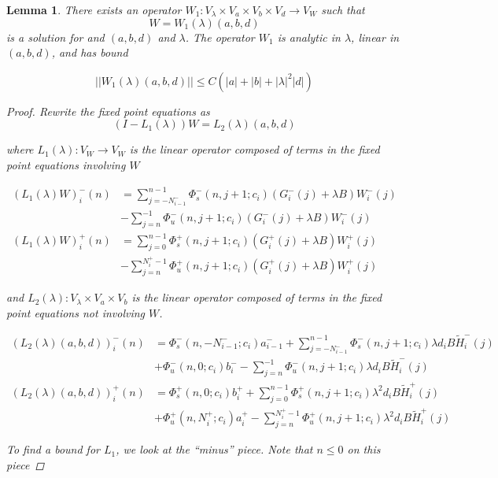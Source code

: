 \documentclass[12pt]{article}
\newtheorem{lemma}{Lemma}
\begin{document}
\begin{lemma}
There exists an operator $W_1: V_\lambda \times V_a \times V_b \times V_d \rightarrow V_W$ such that
\[
W = W_1(\lambda)(a,b,d)
\]
is a solution for and $(a,b,d)$ and $\lambda$. The operator $W_1$ is analytic in $\lambda$, linear in $(a,b,d)$, and has bound

\begin{equation}\label{W1bound}
||W_1(\lambda)(a,b,d)|| \leq C \left( |a| + |b| + |\lambda|^2 |d| \right)
\end{equation}

\begin{proof}
Rewrite the fixed point equations as
\[
(I - L_1(\lambda))W = L_2(\lambda)(a,b,d)
\]

where $L_1(\lambda): V_W \rightarrow V_W$ is the linear operator composed of terms in the fixed point equations involving $W$

\begin{align*}
(L_1(\lambda)W)_i^-(n) &= \sum_{j = -N_{i-1}^-}^{n-1} \Phi_s^-(n, j+1; c_i)
(G_i^-(j) + \lambda B) W_i^-(j) \\&- \sum_{j = n}^{-1} \Phi_u^-(n, j+1; c_i) 
(G_i^-(j) + \lambda B) W_i^-(j)\\
(L_1(\lambda)W)_i^+(n) &= \sum_{j = 0}^{n-1} \Phi_s^+(n, j+1; c_i) 
(G_i^+(j) + \lambda B) W_i^+(j) \\
&-\sum_{j = n}^{N_i^+-1} \Phi_u^+(n, j+1; c_i) 
(G_i^+(j) + \lambda B) W_i^+(j)
\end{align*}

and $L_2(\lambda): V_\lambda \times V_a \times V_b $ is the linear operator composed of terms in the fixed point equations not involving $W$.

\begin{align*}
(L_2(\lambda)(a,b,d))_i^-(n) &= 
\Phi_s^-(n, -N_{i-1}^-; c_i) a_{i-1}^- + \sum_{j = -N_{i-1}^-}^{n-1} \Phi_s^-(n, j+1; c_i)
\lambda d_i B \tilde{H}_i^-(j)
 \\
&+ \Phi_u^-(n, 0; c_i) b_i^- - \sum_{j = n}^{-1} \Phi_u^-(n, j+1; c_i) 
\lambda d_i B \tilde{H}_i^-(j) \\
(L_2(\lambda)(a,b,d))_i^+(n) &= \Phi_s^+(n, 0; c_i) b_i^+ + \sum_{j = 0}^{n-1} \Phi_s^+(n, j+1; c_i)\lambda^2 d_i B \tilde{H}_i^+(j) \\
&+ \Phi_u^+(n, N_i^+; c_i) a_i^+ - \sum_{j = n}^{N_i^+-1} \Phi_u^+(n, j+1; c_i)\lambda^2 d_i B \tilde{H}_i^+(j)
\end{align*}

To find a bound for $L_1$, we look at the ``minus'' piece. Note that $n \leq 0$ on this piece


\end{proof}
\end{lemma}
\end{document}
